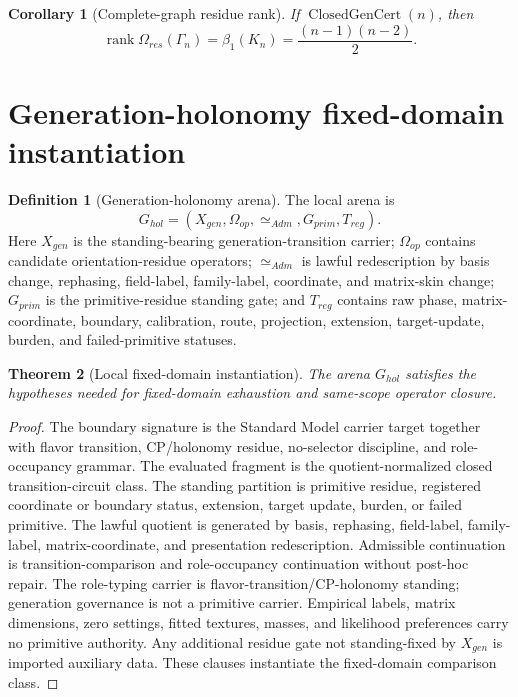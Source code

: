 \documentclass[11pt]{article}
\newcommand{\ClosedGenCert}{\operatorname{ClosedGenCert}}
\newcommand{\rank}{\operatorname{rank}}
\theoremstyle{definition}
\newtheorem{definition}{Definition}[section]
\theoremstyle{plain}
\newtheorem{theorem}{Theorem}[section]
\newtheorem{corollary}[theorem]{Corollary}
\theoremstyle{remark}
\begin{document}
\begin{corollary}[Complete-graph residue rank]
If \(\ClosedGenCert(n)\), then
\[
\rank\Omega_{res}(\Gamma_n)=\beta_1(K_n)=\frac{(n-1)(n-2)}{2}.
\]
\end{corollary}

\section{Generation-holonomy fixed-domain instantiation}

\begin{definition}[Generation-holonomy arena]
The local arena is
\[
G_{hol}=(X_{gen},\Omega_{op},\simeq_{Adm},G_{prim},T_{reg}).
\]
Here \(X_{gen}\) is the standing-bearing generation-transition carrier; \(\Omega_{op}\) contains candidate orientation-residue operators; \(\simeq_{Adm}\) is lawful redescription by basis change, rephasing, field-label, family-label, coordinate, and matrix-skin change; \(G_{prim}\) is the primitive-residue standing gate; and \(T_{reg}\) contains raw phase, matrix-coordinate, boundary, calibration, route, projection, extension, target-update, burden, and failed-primitive statuses.
\end{definition}

\begin{theorem}[Local fixed-domain instantiation]
The arena \(G_{hol}\) satisfies the hypotheses needed for fixed-domain exhaustion and same-scope operator closure.
\end{theorem}
\begin{proof}
The boundary signature is the Standard Model carrier target together with flavor transition, CP/holonomy residue, no-selector discipline, and role-occupancy grammar. The evaluated fragment is the quotient-normalized closed transition-circuit class. The standing partition is primitive residue, registered coordinate or boundary status, extension, target update, burden, or failed primitive. The lawful quotient is generated by basis, rephasing, field-label, family-label, matrix-coordinate, and presentation redescription. Admissible continuation is transition-comparison and role-occupancy continuation without post-hoc repair. The role-typing carrier is flavor-transition/CP-holonomy standing; generation governance is not a primitive carrier. Empirical labels, matrix dimensions, zero settings, fitted textures, masses, and likelihood preferences carry no primitive authority. Any additional residue gate not standing-fixed by \(X_{gen}\) is imported auxiliary data. These clauses instantiate the fixed-domain comparison class.
\end{proof}
\end{document}
